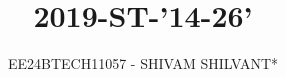 \documentclass[journal]{IEEEtran}
\begin{document}

\vspace{3cm}

\title{2019-ST-'14-26'}
\author{EE24BTECH11057 - SHIVAM SHILVANT*
}
{\let\newpage\relax\maketitle}

\renewcommand{\thefigure}{\theenumi}
\renewcommand{\thetable}{\theenumi}
\setlength{\intextsep}{10pt} %


\renewcommand{\thetable}{\theenumi}
\end{document}
